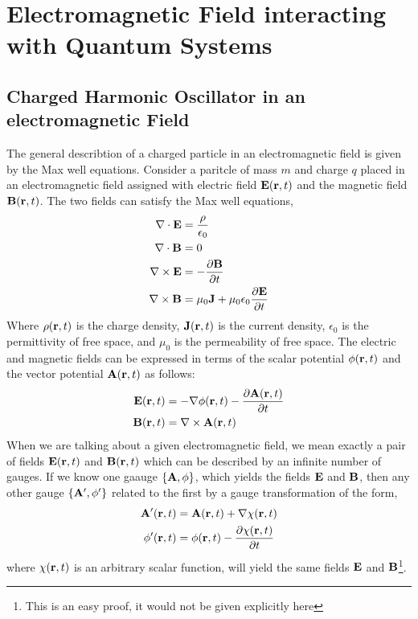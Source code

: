 \chapter{Electromagnetic Field interacting with Quantum Systems}
\section{Charged Harmonic Oscillator in an electromagnetic Field}
The general describtion of a charged particle in an electromagnetic field is given by the Max well equations. Consider a paritcle of mass $m$ and charge $q$ placed in an electromagnetic field assigned with electric field $\mathbf{E}(\mathbf{r},t)$ and the magnetic field $\mathbf{B}(\mathbf{r},t)$. The two fields can satisfy the Max well equations,
\begin{align}
    \nabla \cdot {\mathbf{E}} &= \frac{\rho}{\epsilon_0} \\
    \nabla \cdot{\mathbf{B}} &= 0 \label{eq:charge_nablaB}\\
    \nabla \times{\mathbf{E}} &= - \frac{\partial \mathbf{B}}{\partial t} \\
    \nabla \times {\mathbf{B}} &= \mu_0 \mathbf{J} + \mu_0 \epsilon_0 \frac{\partial \mathbf{E}}{\partial t}
\end{align}
Where $\rho(\mathbf{r},t)$ is the charge density, $\mathbf{J}(\mathbf{r},t)$ is the current density, $\epsilon_0$ is the permittivity of free space, and $\mu_0$ is the permeability of free space. The electric and magnetic fields can be expressed in terms of the scalar potential $\phi(\mathbf{r},t)$ and the vector potential $\mathbf{A}(\mathbf{r},t)$ as follows:
\begin{align}
    \mathbf{E}(\mathbf{r},t) &= - \nabla \phi(\mathbf{r},t) - \frac{\partial \mathbf{A}(\mathbf{r},t)}{\partial t} \label{eq:charge_Efield}\\
    \mathbf{B}(\mathbf{r},t) &= \nabla \times \mathbf{A}(\mathbf{r},t) \label{eq:charge_Bfield}
\end{align}
When we are talking about a given electromagnetic field, we mean exactly a pair of fields $\mathbf{E}(\mathbf{r},t)$ and $\mathbf{B}(\mathbf{r},t)$ which can be described by an infinite number of gauges. If we know one gaauge $\{\mathbf{A},\phi \}$, which yields the fields $\mathbf{E}$ and $\mathbf{B}$, then any other gauge $\{\mathbf{A}',\phi'\}$ related to the first by a gauge transformation of the form,
\begin{align}
    \mathbf{A}'(\mathbf{r},t) &= \mathbf{A}(\mathbf{r},t) + \nabla \chi(\mathbf{r},t) \\
    \phi'(\mathbf{r},t) &= \phi(\mathbf{r},t) - \frac{\partial \chi(\mathbf{r},t)}{\partial t}
\end{align}
where $\chi(\mathbf{r},t)$ is an arbitrary scalar function, will yield the same fields $\mathbf{E}$ and $\mathbf{B}$\footnote{This is an easy proof, it would not be given explicitly here}.

